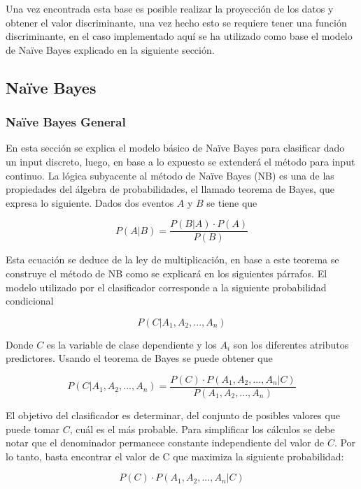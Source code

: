 \documentclass[letter, titlepage, 10pt]{article}
\begin{document}
Una vez encontrada esta base es posible realizar la proyección de los datos y obtener el valor discriminante, una vez hecho esto se requiere tener una función discriminante, en el caso implementado aquí se ha utilizado como base el modelo de Naïve Bayes explicado en la siguiente sección.


\subsection{Naïve Bayes}
  \subsubsection{Naïve Bayes General}
  En esta sección se explica el modelo básico de Naïve Bayes para clasificar dado un input discreto, luego, en base a lo expuesto se extenderá el método para input continuo.
  La lógica subyacente al método de Naïve Bayes (NB) es una de las propiedades del álgebra de probabilidades, el llamado teorema de Bayes, que expresa lo siguiente. Dados dos eventos $A$ y $B$ se tiene que

\begin{equation}
P(A|B) = \frac{P(B|A)\cdot P(A)}{P(B)}
\end{equation}

Esta ecuación se deduce de la ley de multiplicación, en base a este teorema se construye el método de NB como se explicará en los siguientes párrafos. 
El modelo utilizado por el clasificador corresponde a la siguiente probabilidad condicional

\begin{equation}
P(C|A_1,A_2,...,A_n)
\end{equation}

Donde $C$ es la variable de clase dependiente y los $A_i$ son los diferentes atributos predictores. Usando el teorema de Bayes se puede obtener que 

\begin{equation}
P(C|A_1,A_2,...,A_n) = \frac{P(C)\cdot P(A_1,A_2,...,A_n|C)}{P(A_1,A_2,...,A_n)}
\end{equation}

El objetivo del clasificador es determinar, del conjunto de posibles valores que puede tomar $C$, cuál es el más probable. Para simplificar los cálculos se debe notar que el denominador permanece constante independiente del valor de $C$. Por lo tanto, basta encontrar el valor de C que maximiza la siguiente probabilidad:

\begin{equation}
P(C)\cdot P(A_1,A_2,...,A_n|C)
\end{equation}
\end{document}
